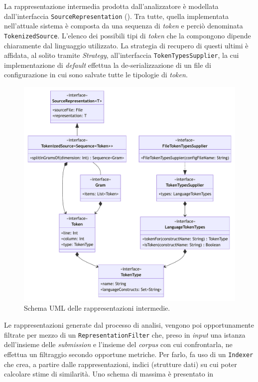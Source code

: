 La rappresentazione intermedia prodotta dall'analizzatore è modellata dall'interfaccia \texttt{SourceRepresentation} (). 
%
Tra tutte, quella implementata nell'attuale sistema è composta da una sequenza di \textit{token} e perciò denominata \texttt{TokenizedSource}.
%
L'elenco dei possibili tipi di \textit{token} che la compongono dipende chiaramente dal linguaggio utilizzato.
%
La strategia di recupero di questi ultimi è affidata, al solito tramite \textit{Strategy}, all'interfaccia \texttt{TokenTypesSupplier}, la cui implementazione di \textit{default} effettua la de-serializzazione di un file di configurazione in cui sono salvate tutte le tipologie di \textit{token}.

\begin{figure}[h!]
    \centering
    \includegraphics[width=\textwidth]{resources/img/02-representations.pdf}
    \caption{Schema UML delle rappresentazioni intermedie.}
    \label{img:02-representations}
\end{figure}

Le rappresentazioni generate dal processo di analisi, vengono poi opportunamente filtrate per mezzo di un \texttt{RepresentationFilter} che, preso in \textit{input} una istanza dell'insieme delle \textit{submission} e l'insieme del \textit{corpus} con cui confrontarla, ne effettua un filtraggio secondo opportune metriche.
%
Per farlo, fa uso di un \texttt{Indexer} che crea, a partire dalle rappresentazioni, indici (strutture dati) su cui poter calcolare stime di similarità.
%
Uno schema di massima è presentato in 

